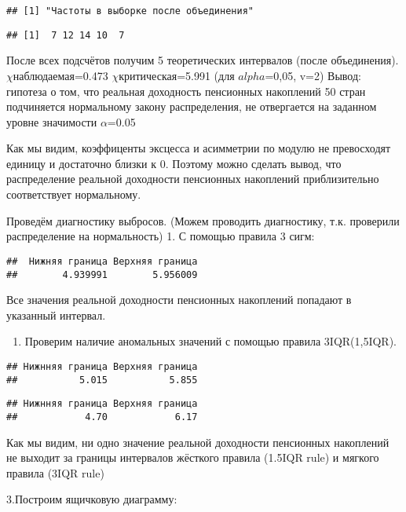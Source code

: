 \documentclass[,]{article}
\providecommand{\tightlist}{%
  \setlength{\itemsep}{0pt}\setlength{\parskip}{0pt}}
\begin{document}
\begin{verbatim}
## [1] "Частоты в выборке после объединения"
\end{verbatim}

\begin{verbatim}
## [1]  7 12 14 10  7
\end{verbatim}

После всех подсчётов получим 5 теоретических интервалов (после
объединения). \(\chi\)наблюдаемая=0.473 \(\chi\)критическая=5.991 (для
\(alpha\)=0,05, v=2) Вывод: гипотеза о том, что реальная доходность
пенсионных накоплений 50 стран подчиняется нормальному закону
распределения, не отвергается на заданном уровне значимости
\(\alpha\)=0.05

Как мы видим, коэффиценты эксцесса и асимметрии по модулю не превосходят
единицу и достаточно близки к 0. Поэтому можно сделать вывод, что
распределение реальной доходности пенсионных накоплений приблизительно
соответствует нормальному.

Проведём диагностику выбросов. (Можем проводить диагностику, т.к.
проверили распределение на нормальность) 1. С помощью правила 3 сигм:

\begin{verbatim}
##  Нижняя граница Верхняя граница 
##        4.939991        5.956009
\end{verbatim}

Все значения реальной доходности пенсионных накоплений попадают в
указанный интервал.

\begin{enumerate}
\def\labelenumi{\arabic{enumi}.}
\setcounter{enumi}{1}
\tightlist
\item
  Проверим наличие аномальных значений с помощью правила 3IQR(1,5IQR).
\end{enumerate}

\begin{verbatim}
## Нижнняя граница Верхняя граница 
##           5.015           5.855
\end{verbatim}

\begin{verbatim}
## Нижнняя граница Верхняя граница 
##            4.70            6.17
\end{verbatim}

Как мы видим, ни одно значение реальной доходности пенсионных накоплений
не выходит за границы интервалов жёсткого правила (1.5IQR rule) и
мягкого правила (3IQR rule)

3.Построим ящичковую диаграмму:
\end{document}
